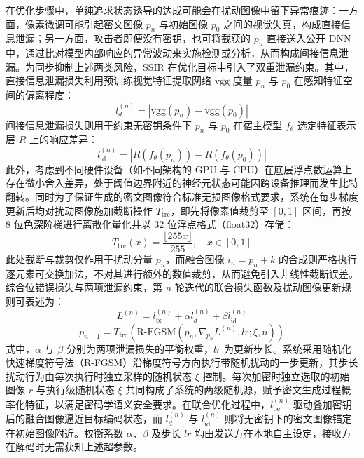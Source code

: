 在优化步骤中，单纯追求状态诱导的达成可能会在扰动图像中留下异常痕迹：一方面，像素微调可能引起密文图像 \(p_n\) 与初始图像 \(p_0\) 之间的视觉失真，构成直接信息泄漏；另一方面，攻击者即便没有密钥，也可将截获的 \(p_n\) 直接送入公开 DNN 中，通过比对模型内部响应的异常波动来实施检测或分析，从而构成间接信息泄漏。为同步抑制上述两类风险，SSIR 在优化目标中引入了双重泄漏约束。其中，直接信息泄漏损失利用预训练视觉特征提取网络 \(\mathrm{vgg}\) 度量 \(p_n\) 与 \(p_0\) 在感知特征空间的偏离程度：
\begin{equation}
    l_d^{(n)} = \left| \mathrm{vgg}(p_n) - \mathrm{vgg}(p_0) \right|
    \label{eq:leak-direct}
\end{equation}
间接信息泄漏损失则用于约束无密钥条件下 \(p_n\) 与 \(p_0\) 在宿主模型 \(f_\theta\) 选定特征表示层 \(R\) 上的响应差异：
\begin{equation}
    l_{\mathrm{id}}^{(n)} = \left| R(f_\theta(p_n)) - R(f_\theta(p_0)) \right|
    \label{eq:leak-indirect}
\end{equation}
此外，考虑到不同硬件设备（如不同架构的 GPU 与 CPU）在底层浮点数运算上存在微小舍入差异，处于阈值边界附近的神经元状态可能因跨设备推理而发生比特翻转。同时为了保证生成的密文图像符合标准无损图像格式要求，系统在每步梯度更新后均对扰动图像施加截断操作 \(T_{\mathrm{trc}}\)，即先将像素值裁剪至 \([0,1]\) 区间，再按 8 位色深阶梯进行离散化量化并以 32 位浮点格式（float32）存储：
\begin{equation}
    T_{\mathrm{trc}}(x) = \frac{\lfloor 255x \rfloor}{255}, \quad x \in [0,1]
    \label{eq:trunc}
\end{equation}
此处截断与裁剪仅作用于扰动分量 \(p_n\)，而融合图像 \(i_n = p_n + k\) 的合成则严格执行逐元素可交换加法，不对其进行额外的数值裁剪，从而避免引入非线性截断误差。综合位错误损失与两项泄漏约束，第 \(n\) 轮迭代的联合损失函数及扰动图像更新规则可表述为：
\begin{equation}
    L^{(n)} = l_{\mathrm{be}}^{(n)} + \alpha l_d^{(n)} + \beta l_{\mathrm{id}}^{(n)}
    \label{eq:jointloss}
\end{equation}
\begin{equation}
    p_{n+1} = T_{\mathrm{trc}} \left( \mathrm{R\text{-}FGSM} \left( p_n, \nabla_{p_n} L^{(n)}, lr; \xi, n \right) \right)
    \label{eq:update}
\end{equation}
式中，\(\alpha\) 与 \(\beta\) 分别为两项泄漏损失的平衡权重，\(lr\) 为更新步长。系统采用随机化快速梯度符号法（R-FGSM）沿梯度符号方向执行带随机扰动的一步更新，其步长扰动行为由每次执行时独立采样的随机状态 \(\xi\) 控制。每次加密时独立选取的初始图像 \(r\) 与执行级随机状态 \(\xi\) 共同构成了系统的两级随机源，赋予密文生成过程概率化特征，以满足密码学语义安全要求。在联合优化过程中，\(l_{\mathrm{be}}^{(n)}\) 驱动叠加密钥后的融合图像逼近目标编码状态，而 \(l_d^{(n)}\) 与 \(l_{\mathrm{id}}^{(n)}\) 则将无密钥下的密文图像锚定在初始图像附近。权衡系数 \(\alpha\)、\(\beta\) 及步长 \(lr\) 均由发送方在本地自主设定，接收方在解码时无需获知上述超参数。

